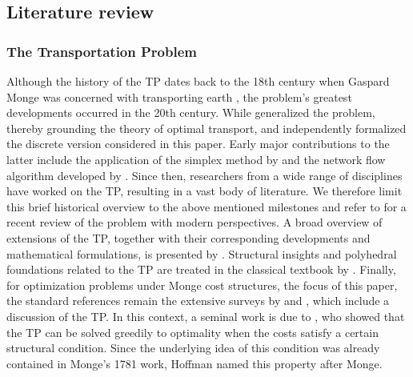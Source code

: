 \documentclass[letterpaper]{article}
\begin{document}
\subsection{Literature review}
\subsubsection{The Transportation Problem}
Although the history of the TP dates back to the 18th century when Gaspard Monge was concerned with transporting earth \citep{monge1781memoire}, the problem's greatest developments occurred in the 20th century. While \citet{Kantorovich1942} generalized the problem, thereby grounding the theory of optimal transport, \citet{hitchcock_distribution_1941} and \citet{koopmans_optimum_1949} independently formalized the discrete version considered in this paper. Early major contributions to the latter include the application of the simplex method by \citet{dantzig1951transportation} and the network flow algorithm developed by \citet{ford_solving_1956}. Since then, researchers from a wide range of disciplines have worked on the TP, resulting in a vast body of literature. We therefore limit this brief historical overview to the above mentioned milestones and refer to \citet{zhang_review_2025} for a recent review of the problem with modern perspectives. A broad overview of extensions of the TP, together with their corresponding developments and mathematical formulations, is presented by \citet{kacher_comprehensive_2021}. Structural insights and polyhedral foundations related to the TP are treated in the classical textbook by \citet{yemelichev1984polytopes}. Finally, for optimization problems under Monge cost structures, the focus of this paper, the standard references remain the extensive surveys by \citet{BurkardKlinzRudolf1996} and \citet{burkard_monge_2007}, which include a discussion of the TP. In this context, a seminal work is due to \citet{Hoffman1963SimpleLP}, who showed that the TP can be solved greedily to optimality when the costs satisfy a certain structural condition. Since the underlying idea of this condition was already contained in Monge's 1781 work, Hoffman named this property after Monge.
\end{document}
